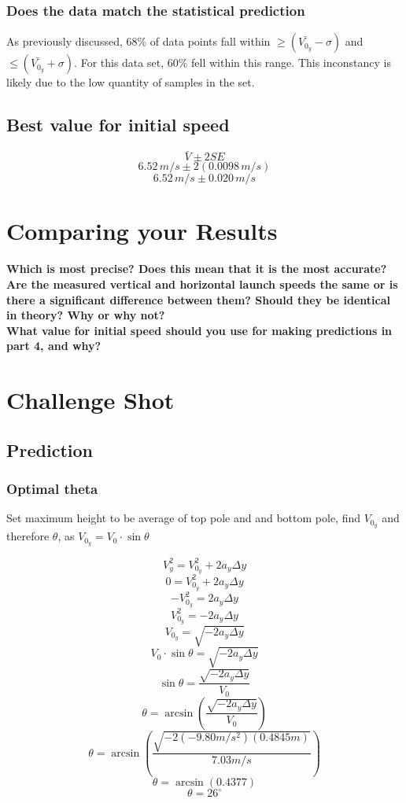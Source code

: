 \documentclass[11pt, letterpaper, includehead]{article}
\begin{document}
\subsubsection{Does the data match the statistical prediction} 
As previously discussed, $68\%$ of 
data points fall within $\geq (\bar{V_{0_y}} - \sigma)$ and $\leq (\bar{V_{0_y}} + \sigma)$. 
For this data set, $60\%$ fell within this range. This inconstancy is likely due to the 
low quantity of samples in the set. 

\subsection{Best value for initial speed} %
$$\bar{V} \pm 2SE$$
$$6.52\, m/s \pm 2( 0.0098 \, m/s)$$
$$\boxed{6.52\, m/s \pm 0.020 \, m/s}$$

\section{Comparing your Results} %
\textbf{Which is most precise? Does this mean that it is the most accurate?}\\ 

\textbf{Are the measured vertical and horizontal launch speeds the same or is there a
significant difference between them? Should they be identical in theory? Why or
why not?}\\

\textbf{What value for initial speed should you use for making predictions in part 4, and
why?}

\section{Challenge Shot} %
\subsection{Prediction} %
\subsubsection{Optimal theta} %
Set maximum height to be average of top pole and and bottom pole, find $V_{0_y}$ and therefore $\theta$,
as $V_{0_y} = V_0\cdot\sin\theta$

$$V_y^2 = V_{0_y}^2 + 2a_y\Delta y$$
$$0 = V_{0_y}^2 + 2a_y\Delta y$$
$$-V_{0_y}^2 = 2a_y\Delta y$$
$$V_{0_y}^2 = -2a_y\Delta y$$
$$V_{0_y} = \sqrt{-2a_y\Delta y}$$
$$V_0\cdot\sin\theta = \sqrt{-2a_y\Delta y}$$
$$\sin\theta = \frac{\sqrt{-2a_y\Delta y}}{V_0}$$
$$\theta = \arcsin\left(\frac{\sqrt{-2a_y\Delta y}}{V_0}\right)$$
$$\theta = \arcsin\left(\frac{\sqrt{-2(-9.80m/s^2)(0.4845m)}}{7.03m/s}\right)$$
$$\theta = \arcsin(0.4377)$$
$$\theta = 26^{\circ}$$
\end{document}
